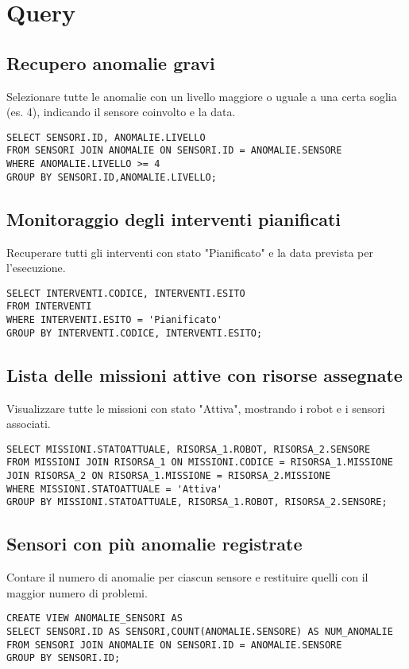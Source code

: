 \section{Query}
\subsection{Recupero anomalie gravi}
Selezionare tutte le anomalie con un livello maggiore o uguale a una certa soglia (es. 4), indicando il sensore coinvolto e la data.
\begin{description}
\begin{verbatim}
SELECT SENSORI.ID, ANOMALIE.LIVELLO
FROM SENSORI JOIN ANOMALIE ON SENSORI.ID = ANOMALIE.SENSORE
WHERE ANOMALIE.LIVELLO >= 4
GROUP BY SENSORI.ID,ANOMALIE.LIVELLO;
\end{verbatim}
\subsection{Monitoraggio degli interventi pianificati}
Recuperare tutti gli interventi con stato "Pianificato" e la data prevista per l'esecuzione.
\begin{verbatim}
SELECT INTERVENTI.CODICE, INTERVENTI.ESITO
FROM INTERVENTI
WHERE INTERVENTI.ESITO = 'Pianificato'
GROUP BY INTERVENTI.CODICE, INTERVENTI.ESITO;
\end{verbatim}
\subsection{Lista delle missioni attive con risorse assegnate}
Visualizzare tutte le missioni con stato "Attiva", mostrando i robot e i sensori associati.
\begin{verbatim}
SELECT MISSIONI.STATOATTUALE, RISORSA_1.ROBOT, RISORSA_2.SENSORE
FROM MISSIONI JOIN RISORSA_1 ON MISSIONI.CODICE = RISORSA_1.MISSIONE JOIN RISORSA_2 ON RISORSA_1.MISSIONE = RISORSA_2.MISSIONE  
WHERE MISSIONI.STATOATTUALE = 'Attiva'
GROUP BY MISSIONI.STATOATTUALE, RISORSA_1.ROBOT, RISORSA_2.SENSORE;
\end{verbatim}
\subsection{Sensori con più anomalie registrate}
Contare il numero di anomalie per ciascun sensore e restituire quelli con il maggior numero di problemi.
\begin{verbatim}
CREATE VIEW ANOMALIE_SENSORI AS
SELECT SENSORI.ID AS SENSORI,COUNT(ANOMALIE.SENSORE) AS NUM_ANOMALIE
FROM SENSORI JOIN ANOMALIE ON SENSORI.ID = ANOMALIE.SENSORE
GROUP BY SENSORI.ID;


\end{verbatim}
\end{description}
